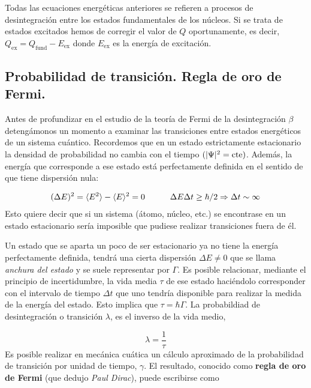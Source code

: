 Todas las ecuaciones energéticas anteriores se refieren a procesos de desintegración entre los estados fundamentales de los núcleos. Si se trata de estados excitados hemos de corregir el valor de $Q$ oportunamente, es decir, $Q_{\text{ex}} = Q_{\text{fund}}-E_{\text{ex}}$ donde $E_{\text{ex}}$ es la energía de excitación.



\subsection{Probabilidad de transición. Regla de oro de Fermi.}

Antes de profundizar en el estudio de la teoría de Fermi de la desintegración $\beta$ detengámonos un momento a examinar las transiciones entre estados energéticos de un sistema cuántico. Recordemos que en un estado estrictamente estacionario la densidad de probabilidad no cambia con el tiempo $(|\Psi|^2 = \text{cte})$. Además, la energía que corresponde a ese estado está perfectamente definida en el sentido de que tiene dispersión nula:

\begin{eqnarray}
	(\Delta E)^2 = \langle E^2 \rangle - \langle E \rangle^2 = 0 \quad \quad \quad \Delta E \Delta t \geq \hbar / 2 \Rightarrow \Delta t \sim \infty
\end{eqnarray}
Esto quiere decir que si un sistema (átomo, núcleo, etc.) se encontrase en un estado estacionario sería imposible que pudiese realizar transiciones fuera de él. %


Un estado que se aparta un poco de ser estacionario ya no tiene la energía perfectamente definida, tendrá una cierta dispersión $\Delta E \neq 0$ que se llama \textit{anchura del estado} y se suele representar por $\Gamma$. Es posible relacionar, mediante el principio de incertidumbre, la vida media $\tau$ de ese estado haciéndolo corresponder con el intervalo de tiempo $\Delta t$ que uno tendría disponible para realizar la medida de la energía del estado. Esto implica que $\tau=\hbar \Gamma$. La probabildiad de desintegración o transición $\lambda$, es el inverso de la vida medio,

\begin{equation}
	\lambda = \frac{1}{\tau}
\end{equation}
Es posible realizar en mecánica cuática un cálculo aproximado de la probabilidad de transición por unidad de tiempo, $\gamma$. El resultado, conocido como \textbf{regla de oro de Fermi} (que dedujo \textit{Paul Dirac}), puede escribirse como

